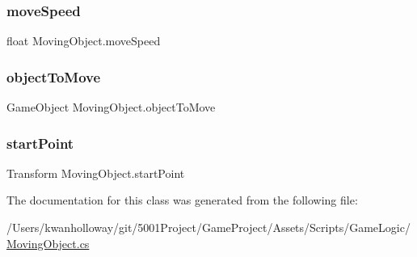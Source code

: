 \mbox{\label{class_moving_object_a1b309484a50fd82bf6a370cd7186da36}} 
\subsubsection{\texorpdfstring{move\+Speed}{moveSpeed}}
{\footnotesize\ttfamily float Moving\+Object.\+move\+Speed}

\mbox{\label{class_moving_object_af4b69a184bdd5b7fdf9f7971fd4f0a33}} 
\subsubsection{\texorpdfstring{object\+To\+Move}{objectToMove}}
{\footnotesize\ttfamily Game\+Object Moving\+Object.\+object\+To\+Move}

\mbox{\label{class_moving_object_a0e64d125d08a40852bfb66f95ed1ae18}} 
\subsubsection{\texorpdfstring{start\+Point}{startPoint}}
{\footnotesize\ttfamily Transform Moving\+Object.\+start\+Point}



The documentation for this class was generated from the following file\+:\begin{DoxyCompactItemize}
\item 
/\+Users/kwanholloway/git/5001\+Project/\+Game\+Project/\+Assets/\+Scripts/\+Game\+Logic/\hyperlink{_moving_object_8cs}{Moving\+Object.\+cs}\end{DoxyCompactItemize}
